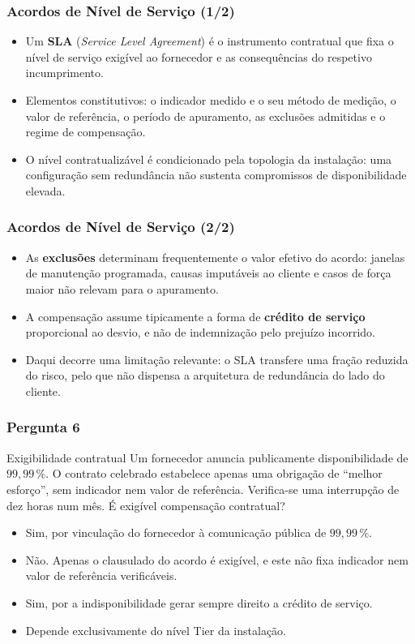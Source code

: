 \documentclass[aspectratio=169]{beamer}
\begin{document}
\begin{frame}
\frametitle{Acordos de Nível de Serviço \textcolor{NudeTaupe}{\small(1/2)}}
\begin{itemize}
    \setlength\itemsep{0.4cm}
    \item Um \textbf{SLA} (\emph{Service Level Agreement}) é o instrumento contratual que fixa o nível de serviço exigível ao fornecedor e as consequências do respetivo incumprimento.
    \item Elementos constitutivos: o indicador medido e o seu método de medição, o valor de referência, o período de apuramento, as exclusões admitidas e o regime de compensação.
    \item O nível contratualizável é condicionado pela topologia da instalação: uma configuração sem redundância não sustenta compromissos de disponibilidade elevada.
\end{itemize}
\end{frame}

\begin{frame}
\frametitle{Acordos de Nível de Serviço \textcolor{NudeTaupe}{\small(2/2)}}
\begin{itemize}
    \setlength\itemsep{0.4cm}
    \item As \textbf{exclusões} determinam frequentemente o valor efetivo do acordo: janelas de manutenção programada, causas imputáveis ao cliente e casos de força maior não relevam para o apuramento.
    \item A compensação assume tipicamente a forma de \textbf{crédito de serviço} proporcional ao desvio, e não de indemnização pelo prejuízo incorrido.
    \item Daqui decorre uma limitação relevante: o SLA transfere uma fração reduzida do risco, pelo que não dispensa a arquitetura de redundância do lado do cliente.
\end{itemize}
\end{frame}

\begin{frame}
\frametitle{Pergunta 6}
\begin{pergunta}{Exigibilidade contratual}
Um fornecedor anuncia publicamente disponibilidade de $99{,}99\,\%$. O contrato celebrado estabelece apenas uma obrigação de \enquote{melhor esforço}, sem indicador nem valor de referência. Verifica-se uma interrupção de dez horas num mês. É exigível compensação contratual?
\begin{itemize}
    \item[A)] Sim, por vinculação do fornecedor à comunicação pública de $99{,}99\,\%$.
    \item[B)] Não. Apenas o clausulado do acordo é exigível, e este não fixa indicador nem valor de referência verificáveis.
    \item[C)] Sim, por a indisponibilidade gerar sempre direito a crédito de serviço.
    \item[D)] Depende exclusivamente do nível Tier da instalação.
\end{itemize}
\end{pergunta}
\end{frame}
\end{document}
